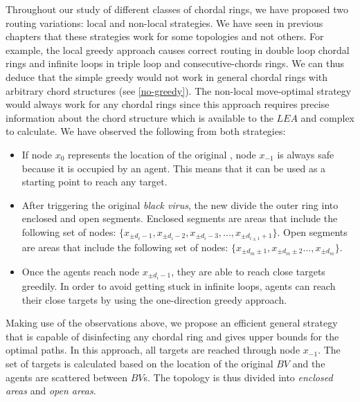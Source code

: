 Throughout our study of different classes of chordal rings, we have proposed two routing variations: local and non-local strategies. We have seen in previous chapters that these strategies work for some topologies and not others. For example, the local greedy approach causes correct routing in double loop chordal rings and infinite loops in triple loop and consecutive-chords rings. We can thus deduce that the simple greedy would not work in general chordal rings with arbitrary chord structures (see \ref{no-greedy}). The non-local move-optimal strategy would always work for any chordal rings since this approach requires precise information about the chord structure which is available to the $LEA$ and complex  to calculate. We have observed the following from both strategies:

\begin{itemize}
\item  If node $x_{0}$ represents the location of the original \bv, node $x_{-1}$ is always safe because it is occupied by an agent. This means that it can be used as a starting point to reach any target.
\item After triggering the original {\it black virus}, the new \bvs divide the outer ring into enclosed and open segments. Enclosed segments are areas that include the following set of nodes: $\{ x_{\pm d_i-1}, x_{\pm d_i-2}, x_{\pm d_i-3},..., x_{\pm d_{i\pm1}+1}\}$. Open segments are areas that include the following set of nodes: $\{ x_{\pm d_m\pm1},  x_{\pm d_m\pm2}..., x_{\pm d_m}\}$.
\item Once the agents reach node $x_{\pm d_i-1}$, they are able to reach close targets greedily. In order to avoid getting stuck in infinite loops, agents can reach their close targets by using the one-direction greedy approach. 
\end{itemize} 

Making use of the observations above, we propose an efficient general strategy that is capable of disinfecting any chordal ring and gives upper bounds for the optimal paths.
In this approach, all targets are reached through node $x_{-1}$. The set of targets is calculated based on the location of the original $BV$ and the agents are scattered between $BV$s. The topology is thus divided into {\it enclosed areas} and {\it open areas}.



